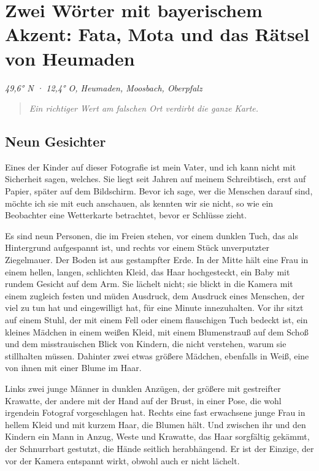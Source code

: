 \documentclass[
  ngerman,
  11pt,
  openany]{book}
\begin{document}
\chapter{Zwei Wörter mit bayerischem Akzent: Fata, Mota und das Rätsel
von Heumaden}\label{cap-2}

\emph{49,6° N · 12,4° O, Heumaden, Moosbach, Oberpfalz}

\begin{quote}
\emph{Ein richtiger Wert am falschen Ort verdirbt die ganze Karte.}
\end{quote}

\section{Neun Gesichter}\label{neun-gesichter}

Eines der Kinder auf dieser Fotografie ist mein Vater, und ich kann
nicht mit Sicherheit sagen, welches. Sie liegt seit Jahren auf meinem
Schreibtisch, erst auf Papier, später auf dem Bildschirm. Bevor ich
sage, wer die Menschen darauf sind, möchte ich sie mit euch anschauen,
als kennten wir sie nicht, so wie ein Beobachter eine Wetterkarte
betrachtet, bevor er Schlüsse zieht.

Es sind neun Personen, die im Freien stehen, vor einem dunklen Tuch, das
als Hintergrund aufgespannt ist, und rechts vor einem Stück unverputzter
Ziegelmauer. Der Boden ist aus gestampfter Erde. In der Mitte hält eine
Frau in einem hellen, langen, schlichten Kleid, das Haar hochgesteckt,
ein Baby mit rundem Gesicht auf dem Arm. Sie lächelt nicht; sie blickt
in die Kamera mit einem zugleich festen und müden Ausdruck, dem Ausdruck
eines Menschen, der viel zu tun hat und eingewilligt hat, für eine
Minute innezuhalten. Vor ihr sitzt auf einem Stuhl, der mit einem Fell
oder einem flauschigen Tuch bedeckt ist, ein kleines Mädchen in einem
weißen Kleid, mit einem Blumenstrauß auf dem Schoß und dem
misstrauischen Blick von Kindern, die nicht verstehen, warum sie
stillhalten müssen. Dahinter zwei etwas größere Mädchen, ebenfalls in
Weiß, eine von ihnen mit einer Blume im Haar.

Links zwei junge Männer in dunklen Anzügen, der größere mit gestreifter
Krawatte, der andere mit der Hand auf der Brust, in einer Pose, die wohl
irgendein Fotograf vorgeschlagen hat. Rechts eine fast erwachsene junge
Frau in hellem Kleid und mit kurzem Haar, die Blumen hält. Und zwischen
ihr und den Kindern ein Mann in Anzug, Weste und Krawatte, das Haar
sorgfältig gekämmt, der Schnurrbart gestutzt, die Hände seitlich
herabhängend. Er ist der Einzige, der vor der Kamera entspannt wirkt,
obwohl auch er nicht lächelt.
\end{document}
